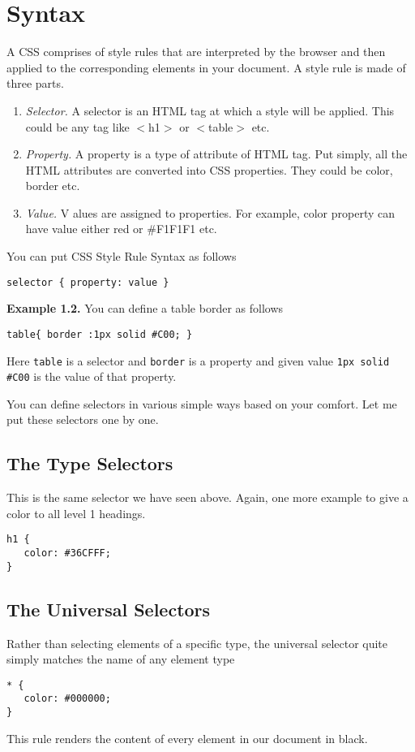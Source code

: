 \documentclass[a4paper,oneside]{book}
\numberwithin{equation}{chapter}
\begin{document}
\section{Syntax}
A CSS comprises of style rules that are interpreted by the browser and then applied to the corresponding elements in your document. A style rule is made of three parts.
\begin{enumerate}
\item \textit{Selector.} A selector is an HTML tag at which a style will be applied. This could be any tag like $<$h1$>$ or $<$table$>$ etc.
\item \textit{Property.} A property is a type of attribute of HTML tag. Put simply, all the HTML attributes are converted into CSS properties. They could be color, border etc.
\item \textit{Value. }V alues are assigned to properties. For example, color property can have value either red or \#F1F1F1 etc.
\end{enumerate}
You can put CSS Style Rule Syntax as follows
\begin{verbatim}
selector { property: value }
\end{verbatim}
\textbf{Example 1.2.} You can define a table border as follows
\begin{verbatim}
table{ border :1px solid #C00; }
\end{verbatim}
Here \texttt{table} is a selector and \texttt{border} is a property and given value \texttt{1px solid \#C00} is the value of that property.

You can define selectors in various simple ways based on your comfort. Let me put these selectors one by one.
\subsection{The Type Selectors}
This is the same selector we have seen above. Again, one more example to give a color to all level 1 headings.
\begin{verbatim}
h1 {
   color: #36CFFF; 
}
\end{verbatim}
\subsection{The Universal Selectors}
Rather than selecting elements of a specific type, the universal selector quite simply matches the name of any element type
\begin{verbatim}
* { 
   color: #000000; 
}
\end{verbatim}
This rule renders the content of every element in our document in black.
\end{document}
